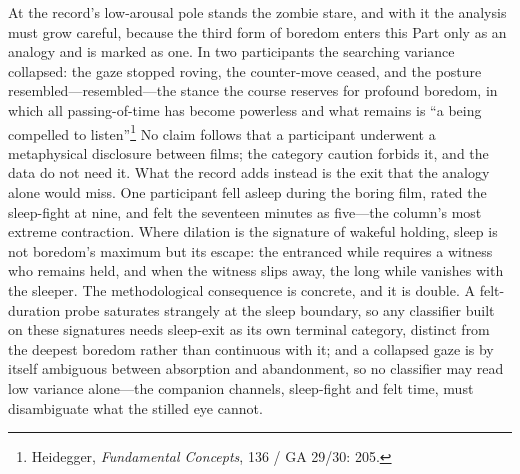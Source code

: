 \documentclass{article}
\begin{document}
At the record's low-arousal pole stands the zombie stare, and with it the analysis must grow careful, because the third form of boredom enters this Part only as an analogy and is marked as one. In two participants the searching variance collapsed: the gaze stopped roving, the counter-move ceased, and the posture resembled---resembled---the stance the course reserves for profound boredom, in which all passing-of-time has become powerless and what remains is ``a being compelled to listen''\footnote{Heidegger, \textit{Fundamental Concepts}, 136 / GA 29/30: 205.} No claim follows that a participant underwent a metaphysical disclosure between films; the category caution forbids it, and the data do not need it. What the record adds instead is the exit that the analogy alone would miss. One participant fell asleep during the boring film, rated the sleep-fight at nine, and felt the seventeen minutes as five---the column's most extreme contraction. Where dilation is the signature of wakeful holding, sleep is not boredom's maximum but its escape: the entranced while requires a witness who remains held, and when the witness slips away, the long while vanishes with the sleeper. The methodological consequence is concrete, and it is double. A felt-duration probe saturates strangely at the sleep boundary, so any classifier built on these signatures needs sleep-exit as its own terminal category, distinct from the deepest boredom rather than continuous with it; and a collapsed gaze is by itself ambiguous between absorption and abandonment, so no classifier may read low variance alone---the companion channels, sleep-fight and felt time, must disambiguate what the stilled eye cannot.
\end{document}
